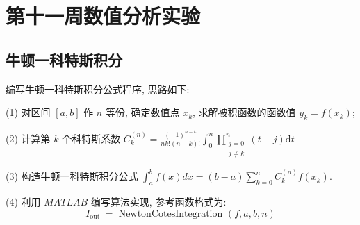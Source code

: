 \section{第十一周数值分析实验}
\subsection{牛顿一科特斯积分}
\begin{ex}
	编写牛顿一科特斯积分公式程序, 思路如下:
	
	(1) 对区间 $[a, b]$ 作 $n$ 等份, 确定数值点 $x_k$, 求解被积函数的函数值 $y_k=f\left(x_k\right)$;
	
	(2) 计算第 $k$ 个科特斯系数 $C_k^{(n)}=\frac{(-1)^{n-k}}{n k !(n-k) !} \int_0^n \prod_{\substack{j=0 \\ j \neq k}}^n(t-j) \mathrm{d} t$
	
	(3) 构造牛顿一科特斯积分公式 $\int_a^b f(x) d x=(b-a) \sum_{k=0}^n C_k^{(n)} f\left(x_k\right)$.
	
	(4) 利用 $M A T L A B$ 编写算法实现, 参考函数格式为:
	$$
	I_{\text {out }}=\text { NewtonCotesIntegration }(f, a, b, n)
	$$
\end{ex}

